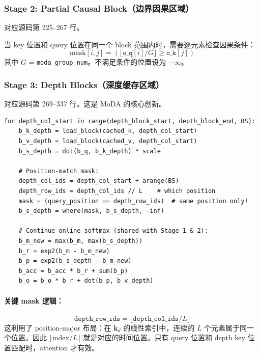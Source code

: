 \documentclass[11pt,a4paper]{article}
\begin{document}
\subsubsection{Stage 2: Partial Causal Block（边界因果区域）}

对应源码第 225--267 行。

当 key 位置和 query 位置在同一个 block 范围内时，需要逐元素检查因果条件：
\begin{equation}
  \text{mask}[i, j] = \left(\lfloor \texttt{o\_q}[i] / G \rfloor \geq \texttt{o\_k}[j]\right)
\end{equation}
其中 $G$ = \texttt{moda\_group\_num}。不满足条件的位置设为 $-\infty$。

\subsubsection{Stage 3: Depth Blocks（深度缓存区域）}

对应源码第 269--337 行。这是 MoDA 的核心创新。

\begin{lstlisting}[title=Stage 3 核心逻辑（伪代码）]
for depth_col_start in range(depth_block_start, depth_block_end, BS):
    b_k_depth = load_block(cached_k, depth_col_start)
    b_v_depth = load_block(cached_v, depth_col_start)
    b_s_depth = dot(b_q, b_k_depth) * scale

    # Position-match mask:
    depth_col_ids = depth_col_start + arange(BS)
    depth_row_ids = depth_col_ids // L    # which position
    mask = (query_position == depth_row_ids)  # same position only!
    b_s_depth = where(mask, b_s_depth, -inf)

    # Continue online softmax (shared with Stage 1 & 2):
    b_m_new = max(b_m, max(b_s_depth))
    b_r = exp2(b_m - b_m_new)
    b_p = exp2(b_s_depth - b_m_new)
    b_acc = b_acc * b_r + sum(b_p)
    b_o = b_o * b_r + dot(b_p, b_v_depth)
\end{lstlisting}

\paragraph{关键 mask 逻辑：}
\begin{equation}
  \texttt{depth\_row\_ids} = \lfloor \texttt{depth\_col\_ids} / L \rfloor
\end{equation}
这利用了 position-major 布局：在 $\mathbf{k}_d$ 的线性索引中，连续的 $L$ 个元素属于同一个位置。因此 $\lfloor \text{index} / L \rfloor$ 就是对应的时间位置。只有 query 位置和 depth key 位置匹配时，attention 才有效。
\end{document}

